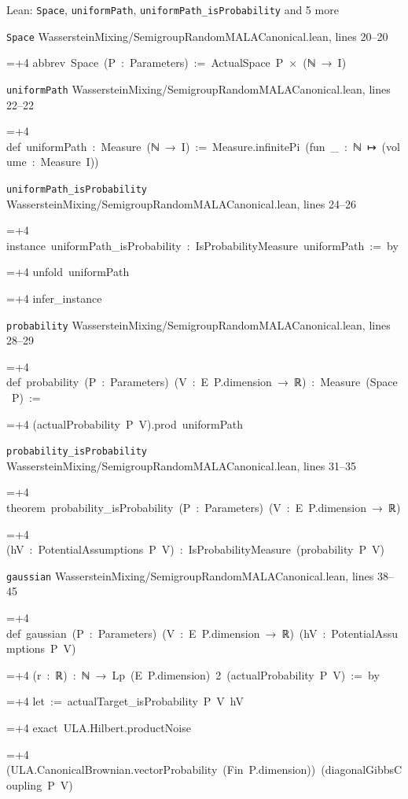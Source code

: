 \documentclass[11pt,a4paper]{report}
\newlength{\leancharwidth}
\newenvironment{leancode}{\par\smallskip\begingroup\ttfamily\footnotesize\raggedright
  \settowidth{\leancharwidth}{M}\setlength{\parskip}{0pt}\setlength{\parindent}{0pt}
  \frenchspacing}{\par\endgroup\smallskip}
\newcommand{\leanline}[2]{\hangindent=\dimexpr#1\leancharwidth+4\leancharwidth\relax
  \hangafter=1\noindent\hspace*{#1\leancharwidth}#2\par}
\newcommand{\leansource}[1]{\par{\footnotesize\color{leanmuted}#1}\par}
\begin{document}
\begin{leanbox}{Lean: \texttt{Space}, \texttt{uniformPath}, \texttt{uniformPath\_\allowbreak{}isProbability} and 5 more}
\leansource{\texttt{Space} \quad WassersteinMixing/\allowbreak{}SemigroupRandomMALACanonical.lean, lines 20–20}
\begin{leancode}
\leanline{0}{abbrev\ Space\ (P\ :\ Parameters)\ :=\ ActualSpace\ P\ ×\ (ℕ\ →\ I)}
\end{leancode}
\leansource{\texttt{uniformPath} \quad WassersteinMixing/\allowbreak{}SemigroupRandomMALACanonical.lean, lines 22–22}
\begin{leancode}
\leanline{0}{def\ uniformPath\ :\ Measure\ (ℕ\ →\ I)\ :=\ Measure.infinitePi\ (fun\ \_\ :\ ℕ\ ↦\ (volume\ :\ Measure\ I))}
\end{leancode}
\leansource{\texttt{uniformPath\_\allowbreak{}isProbability} \quad WassersteinMixing/\allowbreak{}SemigroupRandomMALACanonical.lean, lines 24–26}
\begin{leancode}
\leanline{0}{instance\ uniformPath\_isProbability\ :\ IsProbabilityMeasure\ uniformPath\ :=\ by}
\leanline{2}{unfold\ uniformPath}
\leanline{2}{infer\_instance}
\end{leancode}
\leansource{\texttt{probability} \quad WassersteinMixing/\allowbreak{}SemigroupRandomMALACanonical.lean, lines 28–29}
\begin{leancode}
\leanline{0}{def\ probability\ (P\ :\ Parameters)\ (V\ :\ E\ P.dimension\ →\ ℝ)\ :\ Measure\ (Space\ P)\ :=}
\leanline{2}{(actualProbability\ P\ V).prod\ uniformPath}
\end{leancode}
\leansource{\texttt{probability\_\allowbreak{}isProbability} \quad WassersteinMixing/\allowbreak{}SemigroupRandomMALACanonical.lean, lines 31–35}
\begin{leancode}
\leanline{0}{theorem\ probability\_isProbability\ (P\ :\ Parameters)\ (V\ :\ E\ P.dimension\ →\ ℝ)}
\leanline{4}{(hV\ :\ PotentialAssumptions\ P\ V)\ :\ IsProbabilityMeasure\ (probability\ P\ V)}
\end{leancode}
\leansource{\texttt{gaussian} \quad WassersteinMixing/\allowbreak{}SemigroupRandomMALACanonical.lean, lines 38–45}
\begin{leancode}
\leanline{0}{def\ gaussian\ (P\ :\ Parameters)\ (V\ :\ E\ P.dimension\ →\ ℝ)\ (hV\ :\ PotentialAssumptions\ P\ V)}
\leanline{4}{(r\ :\ ℝ)\ :\ ℕ\ →\ Lp\ (E\ P.dimension)\ 2\ (actualProbability\ P\ V)\ :=\ by}
\leanline{2}{let\ :=\ actualTarget\_isProbability\ P\ V\ hV}
\leanline{2}{exact\ ULA.Hilbert.productNoise}
\leanline{4}{(ULA.CanonicalBrownian.vectorProbability\ (Fin\ P.dimension))\ (diagonalGibbsCoupling\ P\ V)}

\end{leancode}
\end{leanbox}
\end{document}
